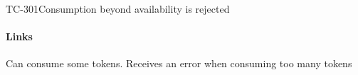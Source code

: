 \begin{testcase}{TC-301}{Consumption beyond availability is rejected}
\label{TC-301}
\paragraph{Links} 

\begin{testprocedure}
    \stage Can consume some tokens.
    \stage Receives an error when consuming too many tokens
\end{testprocedure}
\end{testcase}

